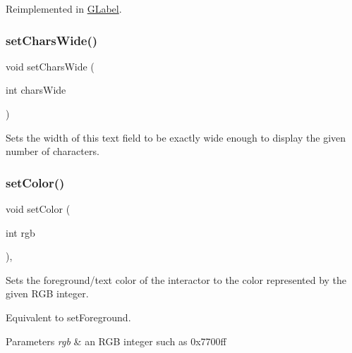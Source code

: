 Reimplemented in \mbox{\hyperlink{classGLabel_a3ed96c7e7adaf111848a90978621066c}{G\+Label}}.

\mbox{\label{classGTextField_aef8026e0b00b17dbccfc456e75308f16}} 
\subsubsection{\texorpdfstring{set\+Chars\+Wide()}{setCharsWide()}}
{\footnotesize\ttfamily void set\+Chars\+Wide (\begin{DoxyParamCaption}\item[{int}]{chars\+Wide }\end{DoxyParamCaption})\hspace{0.3cm}{\ttfamily [virtual]}}



Sets the width of this text field to be exactly wide enough to display the given number of characters. 

\mbox{\label{classGInteractor_ab1f5cc0f5cc6bbbd716a526c61f1081d}} 
\subsubsection{\texorpdfstring{set\+Color()}{setColor()}\hspace{0.1cm}{\footnotesize\ttfamily [1/2]}}
{\footnotesize\ttfamily void set\+Color (\begin{DoxyParamCaption}\item[{int}]{rgb }\end{DoxyParamCaption})\hspace{0.3cm}{\ttfamily [virtual]}, {\ttfamily [inherited]}}



Sets the foreground/text color of the interactor to the color represented by the given R\+GB integer. 

Equivalent to set\+Foreground. 
\begin{DoxyParams}{Parameters}
{\em rgb} & an R\+GB integer such as 0x7700ff \\
\hline
\end{DoxyParams}


